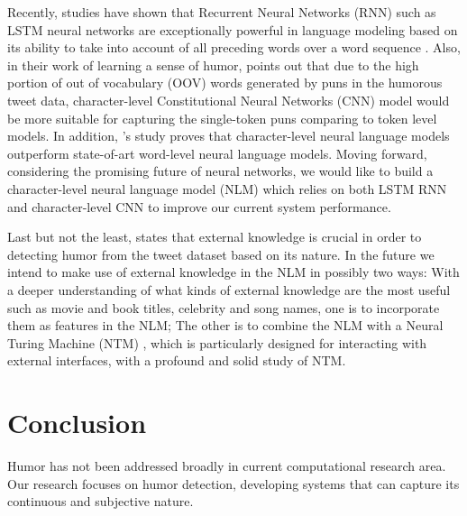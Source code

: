 \documentclass[11pt,a4paper]{article}
\begin{document}
Recently, studies have shown that Recurrent Neural Networks (RNN) such as LSTM neural networks are exceptionally powerful in language modeling based on its ability to take into account of all preceding words over a word sequence \cite{LSTM1} \cite{LSTM2}. Also, in their work of learning a sense of humor, \cite{2016hashtagwars} points out that due to the high portion of out of vocabulary (OOV) words generated by puns in the humorous tweet data, character-level Constitutional Neural Networks (CNN) model would be more suitable for capturing the single-token puns comparing to token level models. In addition, \cite{CNN}'s study proves that character-level neural language models outperform state-of-art word-level neural language models. Moving forward, considering the promising future of neural networks, we would like to build a character-level neural language model (NLM) which relies on both LSTM RNN and character-level CNN to improve our current system performance.

Last but not the least, \cite{2016hashtagwars} states that external knowledge is crucial in order to detecting humor from the tweet dataset based on its nature. In the future we intend to make use of external knowledge in the NLM in possibly two ways: With a deeper understanding of what kinds of external knowledge are the most useful such as movie and book titles, celebrity and song names, one is to incorporate them as features in the NLM; The other is to combine the NLM with a Neural Turing Machine (NTM) \cite{graves2014neural}, which is particularly designed for interacting with external interfaces, with a profound and solid study of NTM.

\section{Conclusion}
Humor has not been addressed broadly in current computational research area. Our research focuses on humor detection, developing systems that can capture its continuous and subjective nature. 
 
%
%


\end{document}
